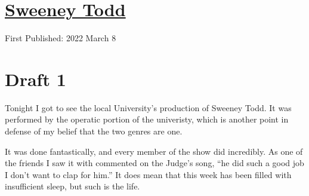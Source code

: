 \documentclass[12pt]{article}[titlepage]
\newcommand{\say}[1]{``#1''}
\newcommand{\1}{\={a}}
\newcommand{\2}{\={e}}
\newcommand{\3}{\={\i}}
\newcommand{\4}{\=o}
\newcommand{\5}{\=u}
\newcommand{\6}{\={A}}
\renewcommand{\,}{\textsuperscript{,}}
\begin{document}
\doublespacing
\section{\href{sweeney.html}{Sweeney Todd}}
First Published: 2022 March 8


\section{Draft 1}
Tonight I got to see the local University's production of Sweeney Todd.
It was performed by the operatic portion of the univeristy, which is another point in defense of my belief that the two genres are one.

It was done fantastically, and every member of the show did incredibly.
As one of the friends I saw it with commented on the Judge's song, \say{he did such a good job I don't want to clap for him.}
It does mean that this week has been filled with insufficient sleep, but such is the life.
\end{document}
